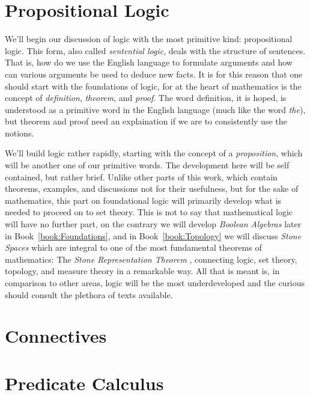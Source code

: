 \begingroup
    \ifcsname\PATH\endcsname
        \newcommand{\PATH}{books/Foundations/Logic}
        \newcommand{\OLDPATH}{\PATH}
    \else
        \newcommand{\OLDPATH}{\PATH}
        \renewcommand{\PATH}{books/Foundations/Logic}
    \fi
    \chapter{Propositional Logic}
        \label{chapt:Propositional_Logic}%
        We'll begin our discussion of logic with the most primitive kind:
        propositional logic. This form, also called
        \textit{sentential logic}, deals with the
        structure of sentences. That is, how do we use the English language to
        formulate arguments and how can various arguments be used to deduce new
        facts. It is for this reason that one should start with the foundations
        of logic, for at the heart of mathematics is the concept of
        \textit{definition}, \textit{theorem}, and \textit{proof}. The word
        definition, it is hoped, is understood as a primitive word in the
        English language (much like the word \textit{the}), but theorem and
        proof need an explaination if we are to consistently use the notions.
        \par\hfill\par
        We'll build logic rather rapidly, starting with the concept of a
        \textit{proposition}, which will be
        another one of our primitive words. The development here will be self
        contained, but rather brief. Unlike other parts of this work, which
        contain theorems, examples, and discussions not for their usefulness,
        but for the sake of mathematics, this part on foundational logic will
        primarily develop what is needed to proceed on to set theory. This is
        not to say that mathematical logic will have
        no further part, on the contrary we will develop
        \textit{Boolean Algebras} later in
        Book~\ref{book:Foundations}, and in Book~\ref{book:Topology} we will
        discuss \textit{Stone Spaces} which are integral to
        one of the most fundamental theorems of mathematics: The
        \textit{Stone Representation Theorem}%
        , connecting logic, set theory,
        topology, and measure theory in a remarkable way. All that is meant is,
        in comparison to other areas, logic will be the most underdeveloped and
        the curious should consult the plethora of texts available.
        
    \chapter{Connectives}
        \label{chapt:Connectives}%
        
    \chapter{Predicate Calculus}
        \label{chapt:Predicate_Calculus}
        
    \renewcommand{\PATH}{\OLDPATH}
\endgroup
